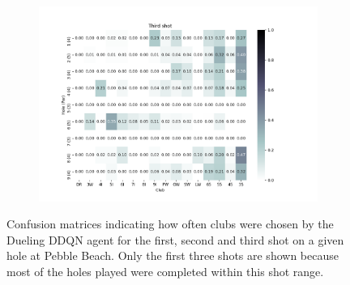 \documentclass{kththesis}
\begin{document}
\begin{figure}
\begin{subfigure}{\textwidth}
    \includegraphics[height=0.3\textheight]{AgentClubChoices/DDDQN_Pebble_Club_Choices_Third_Shot.png} 
    \end{subfigure}
    \caption{Confusion matrices indicating how often clubs were chosen by the Dueling DDQN agent for the first, second and third shot on a given hole at Pebble Beach. Only the first three shots are shown because most of the holes played were completed within this shot range.}
    \label{fig:DDDQN_pebble_club_choice_confusion}
\end{figure}
\end{document}
